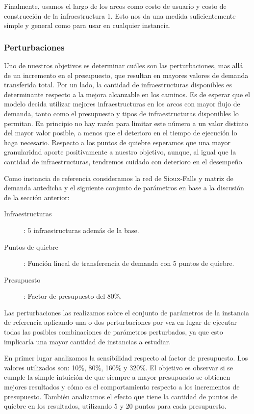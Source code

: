 \documentclass{article}
\begin{document}
  Finalmente, usamos el largo de los arcos como costo de usuario y costo de construcción de la infraestructura 1. Esto nos da una medida suficientemente simple y general como para usar en cualquier instancia.

  \FloatBarrier
  \subsubsection{Perturbaciones}

  Uno de nuestros objetivos es determinar cuáles son las perturbaciones, mas allá de un incremento en el presupuesto, que resultan en mayores valores de demanda transferida total. Por un lado, la cantidad de infraestructuras disponibles es determinante respecto a la mejora alcanzable en los caminos. Es de esperar que el modelo decida utilizar mejores infraestructuras en los arcos con mayor flujo de demanda, tanto como el presupuesto y tipos de infraestructuras disponibles lo permitan. En principio no hay razón para limitar este número a un valor distinto del mayor valor posible, a menos que el deterioro en el tiempo de ejecución lo haga necesario. Respecto a los puntos de quiebre esperamos que una mayor granularidad aporte positivamente a nuestro objetivo, aunque, al igual que la cantidad de infraestructuras, tendremos cuidado con deterioro en el desempeño.

  Como instancia de referencia consideramos la red de Sioux-Falls y matriz de demanda antedicha y el siguiente conjunto de parámetros en base a la discusión de la sección anterior:

  \begin{description}
    \item[Infraestructuras]: 5 infraestructuras además de la base.
    \item[Puntos de quiebre]: Función lineal de transferencia de demanda con 5 puntos de quiebre.
    \item[Presupuesto]: Factor de presupuesto del 80\%.
  \end{description}

  Las perturbaciones las realizamos sobre el conjunto de parámetros de la instancia de referencia aplicando una o dos perturbaciones por vez en lugar de ejecutar todas las posibles combinaciones de parámetros perturbados, ya que esto implicaría una mayor cantidad de instancias a estudiar.

  En primer lugar analizamos la sensibilidad respecto al factor de presupuesto. Los valores utilizados son: 10\%, 80\%, 160\% y 320\%. El objetivo es observar si se cumple la simple intuición de que siempre a mayor presupuesto se obtienen mejores resultados y cómo es el comportamiento respecto a los incrementos de presupuesto. También analizamos el efecto que tiene la cantidad de puntos de quiebre en los resultados, utilizando 5 y 20 puntos para cada presupuesto.
\end{document}
